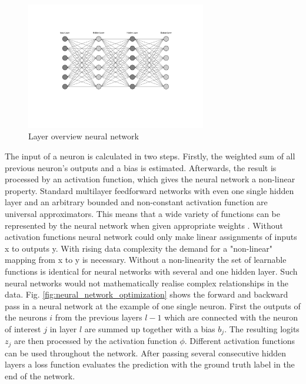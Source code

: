\begin{figure}[htpb]
  \centering
  \includegraphics[width=0.7\textwidth]{neural_network_overview.pdf}
  \caption {Layer overview neural network}
  \label{fig:neural_network_overview}
\end{figure}
The input of a neuron is calculated in two steps. Firstly, the weighted sum of all previous neuron's outputs and a bias is estimated. Afterwards, the result is processed by an activation function, which gives the neural network a non-linear property. Standard multilayer feedforward networks with even one single hidden layer and an arbitrary bounded and non-constant activation function are universal approximators. This means that a wide variety of functions can be represented by the neural network when given appropriate weights \cite{HORNIK1991}. Without activation functions neural network could only make linear assignments of inputs x to outputs y. With rising data complexity the demand for a "non-linear" mapping from x to y is necessary. Without a non-linearity the set of learnable functions is identical for neural networks with several and one hidden layer. Such neural networks would not mathematically realise complex relationships in the data. Fig. \ref{fig:neural_network_optimization} shows the forward and backward pass in a neural network at the example of one single neuron. First the outputs of the neurons $i$ from the previous layers $l-1$ which are connected with the neuron of interest $j$ in layer $l$ are summed up together with a bias $b_{j}$. The resulting logits $z_{j}$ are then processed by the activation function $\phi$. Different activation functions can be used throughout the network. After passing several consecutive hidden layers a loss function evaluates the prediction with the ground truth label in the end of the network.


